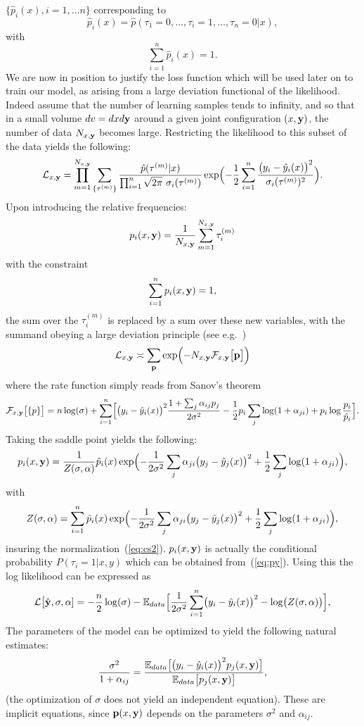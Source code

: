 \documentclass[envcountsect,runningheads]{llncs}
\theoremstyle{etoile}
\begin{document}
$\{\hat p_i(x),i=1,\dots n\}$ corresponding to
\[
\hat p_i(x) = \hat p(\tau_1=0,\ldots,\tau_i=1,\ldots,\tau_n=0\vert x),
\]
with 
\[
\sum_{i=1}^n \hat p_i(x) = 1.
\]
We are now in position to justify the loss function which will be used later on to train our model, as arising from a large deviation functional of the likelihood. Indeed assume that the number of learning samples tends to infinity, and so that in a small volume $dv = dxd{\bf y}$ around a given  joint configuration $(x,{\bf y})$, the number of data $N_{x,{\bf y}}$ becomes large. Restricting the likelihood to this subset of the data yields the following:
\[
{\cal L}_{x,{\bf y}} = \prod_{m=1}^{N_{x,{\bf y}}} \sum_{\{\tau^{(m)}\}} 
\frac{\hat p(\tau^{(m)}\vert x)}{\prod_{i=1}^n\sqrt{2\pi}\ \sigma_i(\tau^{(m)})}
\exp\Bigl(-\frac{1}{2}\sum_{i=1}^n\frac{\bigl(y_i-\hat y_i(x)\bigr)^2}{\sigma_i(\tau^{(m)})^2}\Bigr).
\]
Upon introducing the relative frequencies:
\[
p_i(x,{\bf y}) = \frac{1}{N_{x,{\bf y}}}\sum_{m=1}^{N_{x,{\bf y}}} \tau_i^{(m)} 
\]
with the constraint
\begin{equation}\label{eq:cs2}
\sum_{i=1}^n p_i(x,{\bf y}) = 1,
\end{equation}
the sum over the $\tau_i^{(m)}$ is replaced by a sum over these new variables, with the summand obeying a large deviation principle (see e.g.~\cite{Touchette})
\[
{\cal L}_{x,{\bf y}} \asymp \sum_{{\bf p}} 
\exp\Bigl(-N_{x,{\bf y}} {\cal F}_{x,{\bf y}}\bigl[{\bf p}\bigr]\Bigr)
\]
where the rate function simply reads from Sanov's theorem
\[
{\cal F}_{x,{\bf y}}\bigl[\{p\}\bigr] = n\log(\sigma)+
\sum_{i=1}^n\Bigl[\bigl(y_i-\hat y_i(x)\bigr)^2\frac{1+\sum_j\alpha_{ij}p_j}{2\sigma^2}
-\frac{1}{2}p_i\sum_j\log(1+\alpha_{ji})+p_i\log\frac{p_i}{\hat p_i}\Bigr].
\]
Taking the saddle point yields the following:
\begin{equation}\label{eq:hatpi}
p_i(x,{\bf y}) = \frac{1}{Z(\sigma,{\bf \alpha})}\hat p_i(x)\exp\Bigl(-\frac{1}{2\sigma^2}\sum_j\alpha_{ji}\bigl(y_j-\hat y_j(x)\bigr)^2+\frac{1}{2}\sum_j\log(1+\alpha_{ji})\Bigr),
\end{equation}
with
\[
Z(\sigma,{\bf \alpha}) = \sum_{i=1}^n\hat p_i(x)\exp\Bigl(-\frac{1}{2\sigma^2}\sum_j\alpha_{ji}\bigl(y_j-\hat y_j(x)\bigr)^2+\frac{1}{2}\sum_j\log(1+\alpha_{ji})\Bigr),
\]
insuring the normalization~(\ref{eq:cs2}). $p_i(x,{\bf y})$ is actually the conditional probability $P(\tau_i=1\vert x,y)$ which can be obtained from~(\ref{eq:py}).
Using this the log likelihood can be expressed as
\[
  {\cal L}\bigl[\hat {\bf y},\sigma,{\bf \alpha}] = -\frac{n}{2}\log(\sigma)-{\mathbb E}_{data}\Bigl[\frac{1}{2\sigma^2}\sum_{i=1}^n\bigl(y_i-\hat y_i(x)\bigr)^2
    -\log\bigl(Z(\sigma,{\bf \alpha})\bigr)\Bigr],
\]
The parameters of the model can be optimized to yield the following natural estimates:
\begin{equation}\label{eq:var}
\frac{\sigma^2}{1+\alpha_{ij}} = \frac{{\mathbb E}_{data}\bigl[\bigl(y_i-\hat y_i(x)\bigr)^2p_j(x,{\bf y})\bigr]}{{\mathbb E}_{data}\bigl[p_j(x,{\bf y})\bigr]},
\end{equation}
(the optimization of $\sigma$ does not yield an independent equation).
These are implicit equations, since ${\bf p}(x,{\bf y})$ depends on the parameters $\sigma^2$ and $\alpha_{ij}$.
\end{document}
